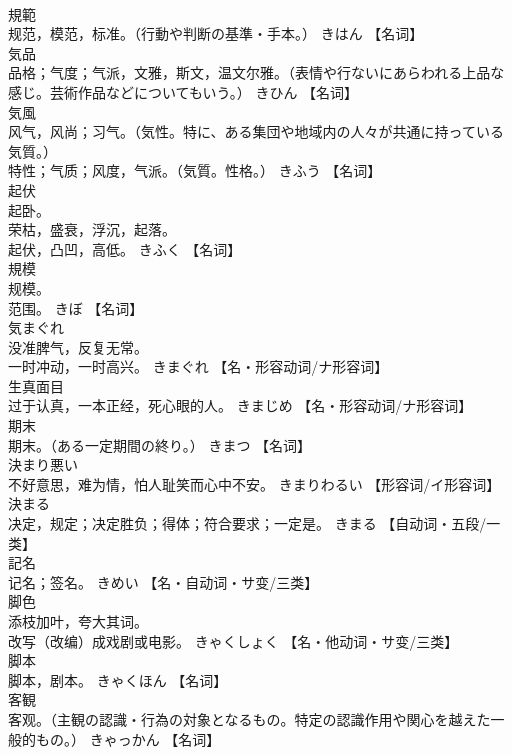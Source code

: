 \documentclass[8pt]{extreport}
\begin{document}
\begin{CJK}{UTF8}{min}
\\	規範	
\\	规范，模范，标准。（行動や判断の基準・手本。）	きはん		【名词】
\\	気品	
\\	品格；气度；气派，文雅，斯文，温文尔雅。（表情や行ないにあらわれる上品な感じ。芸術作品などについてもいう。）	きひん		【名词】
\\	気風	
\\	风气，风尚；习气。（気性。特に、ある集団や地域内の人々が共通に持っている気質。） 
\\	特性；气质；风度，气派。（気質。性格。）	きふう		【名词】
\\	起伏	
\\	起卧。 
\\	荣枯，盛衰，浮沉，起落。 
\\	起伏，凸凹，高低。	きふく		【名词】
\\	規模	
\\	规模。 
\\	范围。	きぼ		【名词】
\\	気まぐれ	
\\	没准脾气，反复无常。 
\\	一时冲动，一时高兴。	きまぐれ		【名・形容动词/ナ形容词】
\\	生真面目	
\\	过于认真，一本正经，死心眼的人。	きまじめ		【名・形容动词/ナ形容词】
\\	期末	
\\	期末。（ある一定期間の終り。）	きまつ		【名词】
\\	決まり悪い	
\\	不好意思，难为情，怕人耻笑而心中不安。	きまりわるい		【形容词/イ形容词】
\\	決まる	
\\	决定，规定；决定胜负；得体；符合要求；一定是。	きまる		【自动词・五段/一类】
\\	記名	
\\	记名；签名。	きめい		【名・自动词・サ变/三类】
\\	脚色	
\\	添枝加叶，夸大其词。 
\\	改写（改编）成戏剧或电影。	きゃくしょく		【名・他动词・サ变/三类】
\\	脚本	
\\	脚本，剧本。	きゃくほん		【名词】
\\	客観	
\\	客观。（主観の認識・行為の対象となるもの。特定の認識作用や関心を越えた一般的もの。）	きゃっかん		【名词】

\end{CJK}
\end{document}
